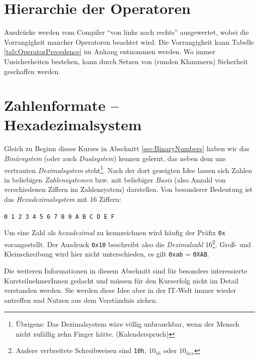 \section{Hierarchie der Operatoren} \label{sec:OperatorHierarchy}
Ausdrücke werden vom Compiler \enquote{von links nach rechts} ausgewertet, wobei die Vorrangigkeit mancher Operatoren beachtet wird. Die Vorrangigkeit kann Tabelle \ref{tab:OperatorPrecedence} im Anhang entnommen werden. Wo immer Unsicherheiten bestehen, kann durch Setzen von (runden Klammern) Sicherheit geschaffen werden.

\section{Zahlenformate -- Hexadezimalsystem} \label{sec:NumSystems}
Gleich zu Beginn dieses Kurses in Abschnitt \ref{sec:BinaryNumbers} haben wir das \emph{Binärsystem} (oder auch \emph{Dualsystem}) kennen gelernt, das neben dem uns vertrauten \emph{Dezimalsystem} steht\footnote{Übrigens: Das Dezimalsystem wäre völlig unbrauchbar, wenn der Mensch nicht zufällig zehn Finger hätte. (Kalenderspruch)}. Nach der dort gezeigten Idee lassen sich Zahlen in beliebigen \emph{Zahlensystemen} bzw. mit beliebiger \emph{Basis} (also Anzahl von verschiedenen Ziffern im Zahlensystem) darstellen. Von besonderer Bedeutung ist das \emph{Hexadezimalsystem} mit 16 Ziffern:

\begin{center}
\texttt{0 1 2 3 4 5 6 7 8 9 A B C D E F}
\end{center}

Um eine Zahl als \emph{hexadezimal} zu kennzeichnen wird häufig der Präfix \texttt{0x} vorangestellt. Der Ausdruck \texttt{0x10} beschreibt also die \emph{Dezimalzahl} 16\footnote{Andere verbreitete Schreibweisen sind \texttt{10h}, \texttt{$10_{16}$} oder \texttt{$10_{hex}$}}. Groß- und Kleinschreibung wird hier nicht unterschieden, es gilt \texttt{0xab} = \texttt{0XAB}.

Die weiteren Informationen in diesem Abschnitt sind für besonders interessierte KursteilnehmerInnen gedacht und müssen für den Kurserfolg nicht im Detail verstanden werden. Sie werden diese Idee aber in der IT-Welt immer wieder antreffen und Nutzen aus dem Verständnis ziehen.

